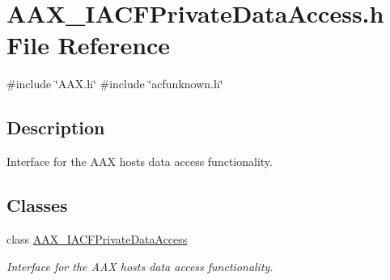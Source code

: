 \hypertarget{a00551}{}\section{A\+A\+X\+\_\+\+I\+A\+C\+F\+Private\+Data\+Access.\+h File Reference}
\label{a00551}
{\ttfamily \#include \char`\"{}A\+A\+X.\+h\char`\"{}}\newline
{\ttfamily \#include \char`\"{}acfunknown.\+h\char`\"{}}\newline


\subsection{Description}
Interface for the A\+AX host\textquotesingle{}s data access functionality. 

\subsection*{Classes}
\begin{DoxyCompactItemize}
\item 
class \mbox{\hyperlink{a01741}{A\+A\+X\+\_\+\+I\+A\+C\+F\+Private\+Data\+Access}}
\begin{DoxyCompactList}\small\item\em Interface for the A\+AX host\textquotesingle{}s data access functionality. \end{DoxyCompactList}\end{DoxyCompactItemize}
